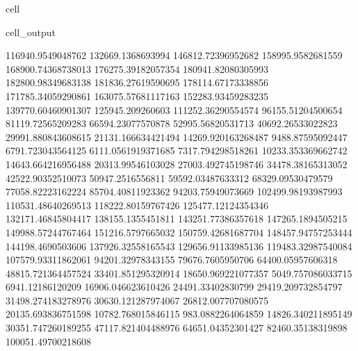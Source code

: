\documentclass[letterpaper,10pt,english]{jupyterBook}
\begin{document}
\begin{sphinxuseclass}{cell}
\begin{sphinxVerbatimOutput}
\begin{sphinxuseclass}{cell_output}
\begin{sphinxVerbatim}[commandchars=\\\{\}]
116940.9549048762  132669.1368693994  146812.72396952682  158995.9582681559  168900.74368738013  176275.39182057354  180941.82080305993  182800.98349683138  181836.27619590695  178114.67173338856  171785.34059290861  163075.57681117163  152283.93459283235  139770.60460901307  125945.209260603  111252.36290554574  96155.51204500654  81119.72565209283  66594.23077570878  52995.56820531713  40692.26533022823  29991.880843608615  21131.166634421494  14269.920163268487  9488.87595092447  6791.723043564125  6111.0561919371685  7317.794298518261  10233.353369662742  14643.664216956488  20313.99546103028  27003.492745198746  34478.38165313052  42522.90352510073  50947.2516556811  59592.03487633312  68329.09530479579  77058.82223162224  85704.40811923362  94203.75949073669  102499.98193987993  110531.48640269513  118222.80159767426  125477.12124354346  132171.46845804417  138155.1355451811  143251.77386357618  147265.1894505215  149988.57244767464  151216.5797665032  150759.42681687704  148457.94757253444  144198.4690503606  137926.32558165543  129656.91133985136  119483.32987540084  107579.93311862061  94201.32978343155  79676.7605950706  64400.05957606318  48815.721364457524  33401.851295320914  18650.969221077357  5049.757086033715  \PYGZhy{}6941.12186120209  \PYGZhy{}16906.046623610426  \PYGZhy{}24491.33402830799  \PYGZhy{}29419.209732854797  \PYGZhy{}31498.274183278976  \PYGZhy{}30630.121287974067  \PYGZhy{}26812.007707080575  \PYGZhy{}20135.693836751598  \PYGZhy{}10782.768015846115  983.0882264064859  14826.340211895149  30351.747260189255  47117.821404488976  64651.04352301427  82460.35138319898  100051.49700218608  

\end{sphinxVerbatim}
\end{sphinxuseclass}
\end{sphinxVerbatimOutput}
\end{sphinxuseclass}
\end{document}
